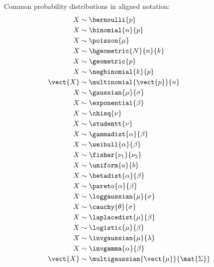Common probability distributions in aligned notation:
\begin{align*}
    X        &\sim \bernoulli{p}                            \\
    X        &\sim \binomial{n}{p}                          \\
    X        &\sim \poisson{\mu}                            \\
    X        &\sim \hgeometric{N}{n}{k}                     \\
    X        &\sim \geometric{p}                            \\
    X        &\sim \negbinomial{k}{p}                       \\
    \vect{X} &\sim \multinomial{\vect{p}}{n}                \\
    X        &\sim \gaussian{\mu}{\sigma}                   \\
    X        &\sim \exponential{\beta}                      \\
    X        &\sim \chisq{\nu}                              \\
    X        &\sim \studentt{\nu}                           \\
    X        &\sim \gammadist{\alpha}{\beta}                \\
    X        &\sim \weibull{\alpha}{\beta}                  \\
    X        &\sim \fisher{\nu_1}{\nu_2}                    \\
    X        &\sim \uniform{a}{b}                           \\
    X        &\sim \betadist{\alpha}{\beta}                 \\
    X        &\sim \pareto{\alpha}{\beta}                   \\
    X        &\sim \loggaussian{\mu}{\sigma}                \\
    X        &\sim \cauchy{\theta}{\sigma}                  \\
    X        &\sim \laplacedist{\mu}{\beta}                 \\
    X        &\sim \logistic{\mu}{\beta}                    \\
    X        &\sim \invgaussian{\mu}{\lambda}               \\
    X        &\sim \invgamma{\alpha}{\beta}                 \\
    \vect{X} &\sim \multigaussian{\vect{\mu}}{\mat{\Sigma}}
\end{align*}

